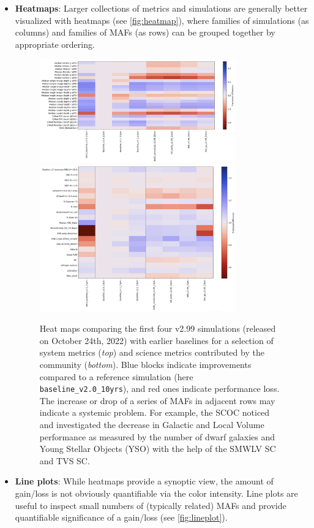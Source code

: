 \begin{itemize}
\item {\bf Heatmaps}: Larger collections of metrics and simulations are generally better visualized with heatmaps (see \autoref{fig:heatmap}), where families of simulations (as columns) and families of MAFs (as rows) can be grouped together by appropriate ordering. 


\begin{figure}[t!]
\centering
\includegraphics[width=0.8\textwidth]{figures/SCOC299heatmap1.png}
\includegraphics[width=0.8\textwidth]{figures/SCOC299heatmap2.png}
\caption{Heat maps comparing the first four v2.99 simulations (released on October 24th, 2022)  with earlier baselines for a selection of system metrics (\emph{top}) and science metrics contributed by the community (\emph{bottom}). Blue blocks indicate improvements compared to a reference simulation (here \texttt{baseline\_v2.0\_10yrs}), and red ones indicate performance loss. The increase or drop of a series of MAFs in adjacent rows may indicate a systemic problem. For example, the SCOC noticed and investigated the decrease in Galactic and Local Volume performance as measured by the number of dwarf galaxies and Young Stellar Objects (YSO) with the help of the SMWLV SC and TVS SC.}
\label{fig:heatmap}
\end{figure}
\FloatBarrier


\item {\bf Line plots}: 
While heatmaps provide a synoptic view, the amount of gain/loss is not obviously quantifiable via the color intensity. Line plots are useful to inspect small numbers of (typically related) MAFs and provide quantifiable significance of a gain/loss (see \autoref{fig:lineplot}). 


\end{itemize}
